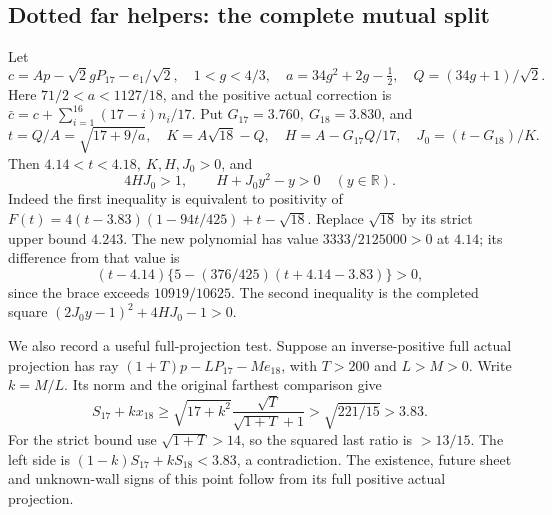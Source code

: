 \subsection{Dotted far helpers: the complete mutual split}
\label{app:B18dottedfar}
Let
\[
 c=Ap-\sqrt2gP_{17}-e_1/\sqrt2,\quad
 1<g<4/3,\quad a=34g^2+2g-\tfrac12,\quad
 Q=(34g+1)/\sqrt2 .
\]
Here \(71/2<a<1127/18\), and the positive actual correction is
\(\bar c=c+\sum_{i=1}^{16}(17-i)n_i/17\).
Put \(G_{17}=3.760,\ G_{18}=3.830\), and
\[
 t=Q/A=\sqrt{17+9/a},\quad K=A\sqrt{18}-Q,\quad
 H=A-G_{17}Q/17,\quad
 J_0=(t-G_{18})/K.
\]
Then \(4.14<t<4.18,\ K,H,J_0>0\), and
\begin{equation}\label{eq:B18quadraticframe}
 4HJ_0>1,\qquad H+J_0y^2-y>0\quad(y\in\mathbb R).
\end{equation}
Indeed the first inequality is equivalent to positivity of
\(F(t)=4(t-3.83)(1-94t/425)+t-\sqrt{18}\).
Replace \(\sqrt{18}\) by its strict upper bound \(4.243\).
The new polynomial has value \(3333/2125000>0\) at \(4.14\);
its difference from that value is
\[
 (t-4.14)\{5-(376/425)(t+4.14-3.83)\}>0,
\]
since the brace exceeds \(10919/10625\). The second inequality
is the completed square
\((2J_0y-1)^2+4HJ_0-1>0\).

We also record a useful full-projection test.
Suppose an inverse-positive full actual projection has ray
\((1+T)p-LP_{17}-Me_{18}\), with \(T>200\) and \(L>M>0\).
Write \(k=M/L\). Its norm and the original farthest comparison give
\[
 S_{17}+kx_{18}\geq
 \sqrt{17+k^2}\frac{\sqrt T}{\sqrt{1+T}+1}
 >\sqrt{221/15}>3.83.
\]
For the strict bound use \(\sqrt{1+T}>14\), so the squared
last ratio is \(>13/15\). The left side is
\((1-k)S_{17}+kS_{18}<3.83\), a contradiction.
The existence, future sheet and unknown-wall signs of this point
follow from its full positive actual projection.


